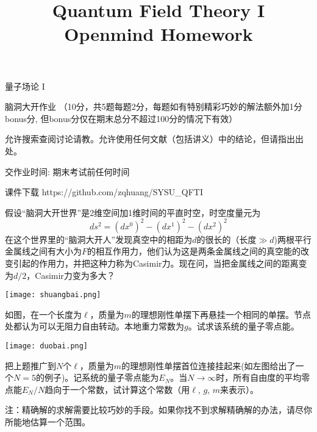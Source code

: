 \documentclass[CJK]{beamer}
\title{Quantum Field Theory I \\ Openmind Homework}
\author{}
\date{}
\begin{document}
\begin{frame}
 
\begin{center}
\begin{Large}
\bch
量子场论 I 

{\vskip 0.3in}

脑洞大开作业 （10分，共5题每题2分，每题如有特别精彩巧妙的解法额外加1分bonus分, 但bonus分仅在期末总分不超过100分的情况下有效）

\skipline
允许搜索查阅讨论请教。允许使用任何文献（包括讲义）中的结论，但请指出出处。

\skipline
交作业时间: 期末考试前任何时间

\ech
\end{Large}
\end{center}

\vskip 0.2in

\bch
课件下载
\ech
https://github.com/zqhuang/SYSU\_QFTI

\end{frame}


\begin{frame}
\bch
假设“脑洞大开世界”是2维空间加1维时间的平直时空，时空度量元为
$$ds^2 = (dx^0)^2 - (dx^1)^2-(dx^2)^2$$
在这个世界里的“脑洞大开人”发现真空中的相距为$d$的很长的（长度$\gg d$)两根平行金属线之间有大小为$F$的相互作用力，他们认为这是两条金属线之间的真空能的改变引起的作用力，并把这种力称为Casimir力。现在问，当把金属线之间的距离变为$d/2$，Casimir力变为多大？

\ech
\end{frame}

\begin{frame}
\bch
\begin{minipage}{0.3\textwidth}
\texttt{[image: shuangbai.png]}
\end{minipage}
\begin{minipage}{0.5\textwidth}
如图，在一个长度为$\ell$，质量为$m$的理想刚性单摆下再悬挂一个相同的单摆。节点处都认为可以无阻力自由转动。本地重力常数为$g$。试求该系统的量子零点能。

\end{minipage}
\ech
\end{frame}

\begin{frame}
\bch
\begin{minipage}{0.3\textwidth}
\texttt{[image: duobai.png]}
\end{minipage}
\begin{minipage}{0.5\textwidth}
把上题推广到$N$个$\ell$，质量为$m$的理想刚性单摆首位连接挂起来(如左图给出了一个$N=5$的例子)。记系统的量子零点能为$E_N$。当$N\rightarrow \infty$时，所有自由度的平均零点能$E_N/N$趋向于一个常数，试计算这个常数（用$\ell$, $g$, $m$来表示）。

\skipline
{\scriptsize 
注：精确解的求解需要比较巧妙的手段。如果你找不到求解精确解的办法，请尽你所能地估算一个范围。
}
\end{minipage}

\ech
\end{frame}
\end{document}
